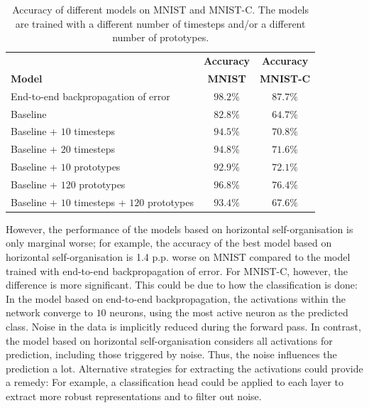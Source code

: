 \begin{table}[h] 
    \centering
	 \begin{tabular}{l c c}
    	 & \textbf{Accuracy} & \textbf{Accuracy}\\
    	 \textbf{Model} & \textbf{MNIST} & \textbf{MNIST-C}\\
        \hline
		End-to-end backpropagation of error & $98.2\%$ & $87.7\%$\\
		Baseline & $82.8\%$ & $64.7\%$\\
		Baseline + $10$ timesteps & $94.5\%$ & $70.8\%$\\
		Baseline + $20$ timesteps & $94.8\%$ & $71.6\%$\\
		Baseline + $10$ prototypes & $92.9\%$ & $72.1\%$\\
		Baseline + $120$ prototypes & $96.8\%$ & $76.4\%$\\
		Baseline + $10$ timesteps + $120$ prototypes & $93.4\%$ & $67.6\%$\\
    \end{tabular}
    \caption[Accuracy of different models on MNIST and MNIST-C]{Accuracy of different models on MNIST and MNIST-C. The models are trained with a different number of timesteps and/or a different number of prototypes.}
\end{table}

However, the performance of the models based on horizontal self-organisation is only marginal worse; for example, the accuracy of the best model based on horizontal self-organisation is 1.4 p.p. worse  on MNIST compared to the model trained with end-to-end backpropagation of error. For MNIST-C, however, the difference is more significant. This could be due to how the classification is done: In the model based on end-to-end backpropagation, the activations within the network converge to $10$ neurons, using the most active neuron as the predicted class. Noise in the data is implicitly reduced during the forward pass.
In contrast, the model based on horizontal self-organisation considers all activations for prediction, including those triggered by noise. Thus, the noise influences the prediction a lot. Alternative strategies for extracting the activations could provide a remedy: For example, a classification head could be applied to each layer to extract more robust representations and to filter out noise.